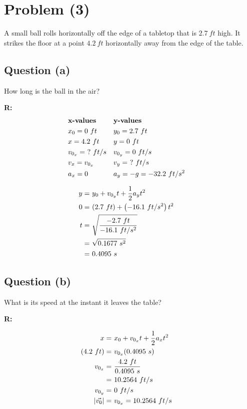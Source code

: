 \section{Problem (3)}
	A small ball rolls horizontally off the edge of a tabletop that is $2.7 \ ft$ high. It strikes the floor at a point $4.2 \ ft$ horizontally away from the edge of the table.

	\subsection{Question (a)}

		How long is the ball in the air?

		\textbf{R:} \newline
		\begin{align}
			&\textbf{x-values}& &\textbf{y-values}& \notag \\
			&x_{0} = 0 \ ft& &y_{0} = 2.7 \ ft& \notag \\
			&x = 4.2 \ ft& &y = 0 \ ft& \notag \\
			&v_{0_{x}} = \ ? \ ft/s& &v_{0_{y}} = 0 \ ft/s& \notag \\
			&v_{x} = v_{0_{x}}& &v_{y} = \ ? \ ft/s& \notag \\
			&a_{x} = 0& &a_{y} = -g = -32.2 \ ft/s^{2}& \notag
		\end{align}

		\begin{align}
			y = \ &y_{0} + v_{0_{y}}t + \frac{1}{2}a_{y}t^{2}& \notag \\
			0 = \ &(2.7 \ ft) + \left( - 16.1 \ ft/s^{2} \right)t^{2}& \notag \\
			t = \ &\sqrt{\frac{-2.7 \ ft}{- 16.1 \ ft/s^{2}}}& \notag \\
			= \ &\sqrt{0.1677 \ s^{2}}& \notag \\
			= \ &0.4095 \ s&
		\end{align}

	\subsection{Question (b)}

		What is its speed at the instant it leaves the table?

		\textbf{R:} \newline

		\begin{align}
			x = \ &x_{0} + v_{0_{x}}t + \frac{1}{2}a_{x}t^{2}& \notag \\
			(4.2 \ ft) = \ &v_{0_{x}}(0.4095 \ s)& \notag \\
			v_{0_{x}} = \ &\frac{4.2 \ ft}{0.4095 \ s}& \notag \\
			= \ &10.2564 \ ft/s& \notag \\
			v_{0_{y}} = \ &0 \ ft/s& \notag \\
			\left| \vec{v_{0}} \right| = \ &v_{0_{x}} = 10.2564 \ ft/s&
		\end{align}
